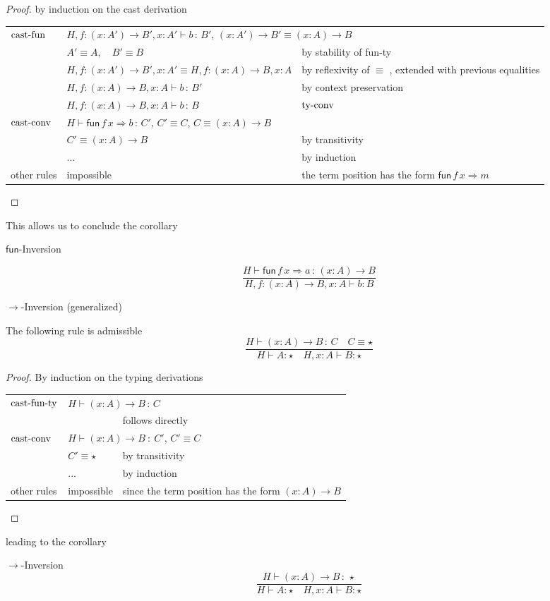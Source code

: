 \begin{proof}
by induction on the cast derivation

\begin{tabular}{lll}
$\operatorname{cast-fun}$ & \multicolumn{2}{l}{$H,f:\left(x:A'\right)\rightarrow B',x:A'\vdash b\,:\,B'$, $\left(x:A'\right)\rightarrow B'\equiv\left(x:A\right)\rightarrow B$}\tabularnewline
 & $A'\equiv A,\quad B'\equiv B$ & by stability of fun-ty\tabularnewline
 & $H,f:\left(x:A'\right)\rightarrow B',x:A'\equiv H,f:\left(x:A\right)\rightarrow B,x:A$ & by reflexivity of $\equiv$ , extended with previous equalities\tabularnewline
 & $H,f:\left(x:A\right)\rightarrow B,x:A\vdash b\,:\,B'$ & by context preservation\tabularnewline
 & $H,f:\left(x:A\right)\rightarrow B,x:A\vdash b\,:\,B$ & $\operatorname{ty-conv}$\tabularnewline
$\operatorname{cast-conv}$ & \multicolumn{2}{l}{$H\vdash\mathsf{fun}\,f\,x\Rightarrow b\,:\,C'$, $C'\equiv C$, $C\equiv\left(x:A\right)\rightarrow B$}\tabularnewline
 & $C'\equiv\left(x:A\right)\rightarrow B$ & by transitivity\tabularnewline
 & ... & by induction\tabularnewline
other rules & impossible & the term position has the form $\mathsf{fun}\,f\,x\Rightarrow m$\tabularnewline
\end{tabular}
\end{proof}
This allows us to conclude the corollary 
\begin{cor}
$\mathsf{fun}$-Inversion 

\[
\frac{H\vdash\mathsf{fun}\,f\,x\Rightarrow a\,:\,\left(x:A\right)\rightarrow B}{H,f:\left(x:A\right)\rightarrow B,x:A\vdash b:B}
\]
\end{cor}

\begin{lem}
$\rightarrow$-Inversion (generalized)

The following rule is admissible
\[
\frac{H\vdash\left(x:A\right)\rightarrow B\,:\,C\quad C\equiv\star}{H\vdash A:\star\quad H,x:A\vdash B:\star}
\]
\end{lem}

\begin{proof}
By induction on the typing derivations

\begin{tabular}{lll}
$\operatorname{cast-fun-ty}$ & \multicolumn{2}{l}{$H\vdash\left(x:A\right)\rightarrow B\,:\,C$}\tabularnewline
 &  & follows directly\tabularnewline
$\operatorname{cast-conv}$ & \multicolumn{2}{l}{$H\vdash\left(x:A\right)\rightarrow B\::\:C'$, $C'\equiv C$}\tabularnewline
 & $C'\equiv\star$ & by transitivity\tabularnewline
 & ... & by induction\tabularnewline
other rules & impossible & since the term position has the form $\left(x:A\right)\rightarrow B$\tabularnewline
\end{tabular}
\end{proof}
leading to the corollary
\begin{cor}
$\rightarrow$-Inversion
\[
\frac{H\vdash\left(x:A\right)\rightarrow B\,:\,\star}{H\vdash A:\star\quad H,x:A\vdash B:\star}
\]
\end{cor}

